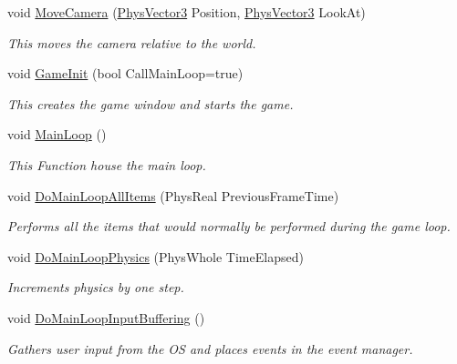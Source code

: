 \begin{DoxyCompactItemize}
void \hyperlink{classPhysWorld_a1df24ee06d5881825902b60e0d81174a}{MoveCamera} (\hyperlink{classPhysVector3}{PhysVector3} Position, \hyperlink{classPhysVector3}{PhysVector3} LookAt)
\begin{DoxyCompactList}\small\item\em This moves the camera relative to the world. \item\end{DoxyCompactList}\item 
void \hyperlink{classPhysWorld_afc5116f97cc1e91e899d1a1ca7e14e9b}{GameInit} (bool CallMainLoop=true)
\begin{DoxyCompactList}\small\item\em This creates the game window and starts the game. \item\end{DoxyCompactList}\item 
void \hyperlink{classPhysWorld_ad41cad0347b6f5ba7ec05568aaffa514}{MainLoop} ()
\begin{DoxyCompactList}\small\item\em This Function house the main loop. \item\end{DoxyCompactList}\item 
void \hyperlink{classPhysWorld_a174da29a119080c44ba628cb25918f8c}{DoMainLoopAllItems} (PhysReal PreviousFrameTime)
\begin{DoxyCompactList}\small\item\em Performs all the items that would normally be performed during the game loop. \item\end{DoxyCompactList}\item 
void \hyperlink{classPhysWorld_a4d8e06d2f8459a286eb01e68df2d1828}{DoMainLoopPhysics} (PhysWhole TimeElapsed)
\begin{DoxyCompactList}\small\item\em Increments physics by one step. \item\end{DoxyCompactList}\item 
void \hyperlink{classPhysWorld_a81b3f0dcc0a90d039623f696343e6e9c}{DoMainLoopInputBuffering} ()
\begin{DoxyCompactList}\small\item\em Gathers user input from the OS and places events in the event manager. \item\end{DoxyCompactList}\item 

\end{DoxyCompactItemize}
